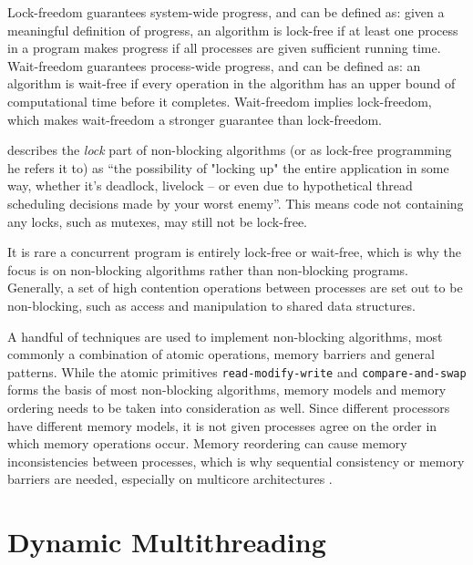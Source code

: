 Lock\hyp{}freedom guarantees system\hyp{}wide progress, and can be defined as: given a meaningful definition of progress, an algorithm is lock\hyp{}free if at least one process in a program makes progress if all processes are given sufficient running time. Wait\hyp{}freedom guarantees process\hyp{}wide progress, and can be defined as: an algorithm is wait\hyp{}free if every operation in the algorithm has an upper bound of computational time before it completes. Wait\hyp{}freedom implies lock\hyp{}freedom, which makes wait\hyp{}freedom a stronger guarantee than lock\hyp{}freedom.

\citet{preshing2012lockfree} describes the \textit{lock} part of non\hyp{}blocking algorithms (or as lock\hyp{}free programming he refers it to) as ``the possibility of "locking up" the entire application in some way, wheth\-er it's deadlock, livelock -- or even due to hypothetical thread scheduling decisions made by your worst enemy''. This means code not containing any locks, such as mutexes, may still not be lock\hyp{}free. 

It is rare a concurrent program is entirely lock\hyp{}free or wait\hyp{}free, which is why the focus is on non\hyp{}blocking algorithms rather than non\hyp{}blocking programs. Generally, a set of high contention operations between processes are set out to be non\hyp{}blocking, such as access and manipulation to shared data structures.

A handful of techniques are used to implement non\hyp{}blocking algorithms, most commonly a combination of atomic operations, memory barriers and general patterns. While the atomic primitives \texttt{read\hyp{}modify\hyp{}write} and \texttt{compare\hyp{}and\hyp{}swap} forms the basis of most non\hyp{}blocking algorithms, memory models and memory ordering needs to be taken into consideration as well. Since different processors have different memory models, it is not given processes agree on the order in which memory operations occur. Memory reordering can cause memory inconsistencies between processes, which is why sequential consistency or memory barriers are needed, especially on multicore architectures \citep{preshing2012weakstrong,preshing2012barriers,preshing2012lockfree,preshing2012acquire}.


\section{Dynamic Multithreading}
\label{sec:dynamic_multithreading}


